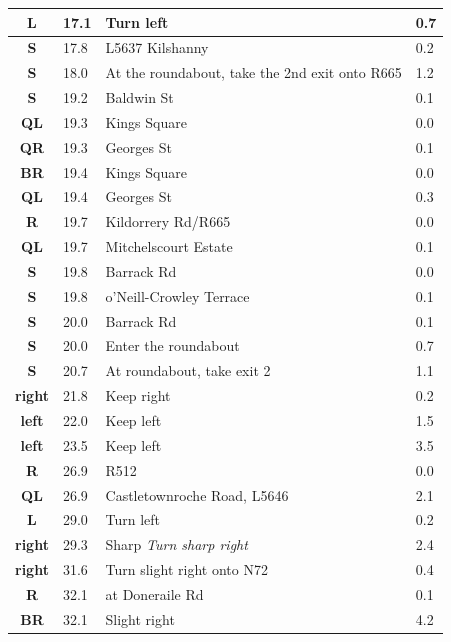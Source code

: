 \documentclass[11pt]{article}
\begin{document}
\begin{center}
\begin{supertabular}{|c|p{0.30in}|p{2.25in}|l|}
 \textbf{L} &  17.1 & Turn left &   0.7 \\ \hline
 \textbf{S} &  17.8 & L5637 Kilshanny &   0.2 \\ \hline
 \textbf{S} &  18.0 & At the roundabout, take the 2nd exit onto R665 &   1.2 \\ \hline
 \textbf{S} &  19.2 & Baldwin St &   0.1 \\ \hline
 \textbf{QL} &  19.3 & Kings Square &   0.0 \\ \hline
{} \textbf{QR} &  19.3 & Georges St &   0.1 \\ \hline
{} \textbf{BR} &  19.4 & Kings Square &   0.0 \\ \hline
 \textbf{QL} &  19.4 & Georges St &   0.3 \\ \hline
{} \textbf{R} &  19.7 & Kildorrery Rd/\hspace{0pt}R665 &   0.0 \\ \hline
 \textbf{QL} &  19.7 & Mitchelscourt Estate &   0.1 \\ \hline
 \textbf{S} &  19.8 & Barrack Rd &   0.0 \\ \hline
 \textbf{S} &  19.8 & o'Neill-Crowley Terrace &   0.1 \\ \hline
 \textbf{S} &  20.0 & Barrack Rd &   0.1 \\ \hline
 \textbf{S} &  20.0 & Enter the roundabout &   0.7 \\ \hline
 \textbf{S} &  20.7 & At roundabout, take exit 2 &   1.1 \\ \hline
 \textbf{right} &  21.8 & Keep right &   0.2 \\ \hline
 \textbf{left} &  22.0 & Keep left &   1.5 \\ \hline
 \textbf{left} &  23.5 & Keep left &   3.5 \\ \hline
{} \textbf{R} &  26.9 & R512 &   0.0 \\ \hline
 \textbf{QL} &  26.9 & Castletownroche Road, L5646 &   2.1 \\ \hline
 \textbf{L} &  29.0 & Turn left &   0.2 \\ \hline
 \textbf{right} &  29.3 & Sharp \newline \textit{Turn sharp right} &   2.4 \\ \hline
 \textbf{right} &  31.6 & Turn slight right onto N72 &   0.4 \\ \hline
{} \textbf{R} &  32.1 & at Doneraile Rd &   0.1 \\ \hline
{} \textbf{BR} &  32.1 & Slight right &   4.2 \\ \hline

\end{supertabular}
\end{center}
\end{document}
